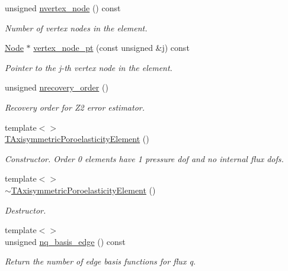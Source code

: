 \begin{DoxyCompactItemize}
unsigned \hyperlink{classoomph_1_1TAxisymmetricPoroelasticityElement_a0ca2892eb086103a351bcd202f10f98d}{nvertex\+\_\+node} () const
\begin{DoxyCompactList}\small\item\em Number of vertex nodes in the element. \end{DoxyCompactList}\item 
\hyperlink{classoomph_1_1Node}{Node} $\ast$ \hyperlink{classoomph_1_1TAxisymmetricPoroelasticityElement_a1749e03cc97bca4463870f4640e444b0}{vertex\+\_\+node\+\_\+pt} (const unsigned \&j) const
\begin{DoxyCompactList}\small\item\em Pointer to the j-\/th vertex node in the element. \end{DoxyCompactList}\item 
unsigned \hyperlink{classoomph_1_1TAxisymmetricPoroelasticityElement_afc5e75420d95d3a70cb5f43aa32f9430}{nrecovery\+\_\+order} ()
\begin{DoxyCompactList}\small\item\em Recovery order for Z2 error estimator. \end{DoxyCompactList}\item 
{\footnotesize template$<$$>$ }\\\hyperlink{classoomph_1_1TAxisymmetricPoroelasticityElement_a3fbfdd2e753f9434b800c60fd97396a0}{T\+Axisymmetric\+Poroelasticity\+Element} ()
\begin{DoxyCompactList}\small\item\em Constructor. Order 0 elements have 1 pressure dof and no internal flux dofs. \end{DoxyCompactList}\item 
{\footnotesize template$<$$>$ }\\\hyperlink{classoomph_1_1TAxisymmetricPoroelasticityElement_a0677e802136d5e4e7c69b545f7261792}{$\sim$\+T\+Axisymmetric\+Poroelasticity\+Element} ()
\begin{DoxyCompactList}\small\item\em Destructor. \end{DoxyCompactList}\item 
{\footnotesize template$<$$>$ }\\unsigned \hyperlink{classoomph_1_1TAxisymmetricPoroelasticityElement_adcb6279faff778530b9fb118f56636e4}{nq\+\_\+basis\+\_\+edge} () const
\begin{DoxyCompactList}\small\item\em Return the number of edge basis functions for flux q. \end{DoxyCompactList}\item 

\end{DoxyCompactItemize}
